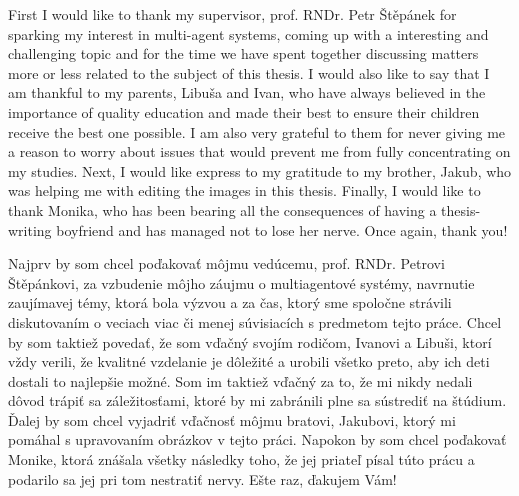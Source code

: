 
First I would like to thank my supervisor, prof. RNDr. Petr Štěpánek for sparking my interest in multi-agent systems, coming up with a interesting and challenging topic and for the time we have spent together discussing matters more or less related to the subject of this thesis.
I would also like to say that I am thankful to my parents, Libuša and Ivan, who have always believed in the importance of quality education and made their best to ensure their children receive the best one possible.
I am also very grateful to them for never giving me a reason to worry about issues that would prevent me from fully concentrating on my studies.
Next, I would like express to my gratitude to my brother, Jakub, who was helping me with editing the images in this thesis.
Finally, I would like to thank Monika, who has been bearing all the consequences of having a thesis-writing boyfriend and has managed not to lose her nerve.
Once again, thank you!

\frenchspacing

Najprv by som chcel poďakovať môjmu vedúcemu, prof. RNDr. Petrovi Štěpánkovi, za vzbudenie môjho záujmu o multiagentové systémy, navrnutie zaujímavej témy, ktorá bola výzvou a za čas, ktorý sme spoločne strávili diskutovaním o veciach viac či menej súvisiacích s predmetom tejto práce.
Chcel by som taktiež povedať, že som vďačný svojím rodičom, Ivanovi a Libuši, ktorí vždy verili, že kvalitné vzdelanie je dôležité a urobili všetko preto, aby ich deti dostali to najlepšie možné.
Som im taktiež vďačný za to, že mi nikdy nedali dôvod trápiť sa záležitosťami, ktoré by mi zabránili plne sa sústrediť na štúdium.
Ďalej by som chcel vyjadriť vďačnosť môjmu bratovi, Jakubovi, ktorý mi pomáhal s upravovaním obrázkov v tejto práci.
Napokon by som chcel poďakovať Monike, ktorá znášala všetky následky toho, že jej priateľ písal túto prácu a podarilo sa jej pri tom nestratiť nervy.
Ešte raz, ďakujem Vám!

\nonfrenchspacing 